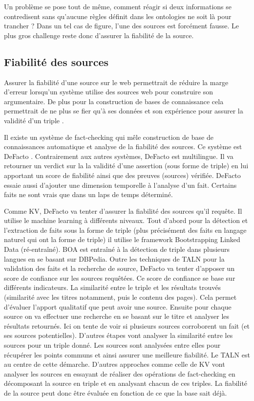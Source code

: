 Un problème se pose tout de même, comment réagir si deux informations se contredisent sans qu'aucune règles définit dans les ontologies ne soit là pour trancher ? Dans un tel cas de figure, l'une des sources est forcément fausse. Le plus gros challenge reste donc d'assurer la fiabilité de la source.

\subsection{Fiabilité des sources}

Assurer la fiabilité d'une source sur le web permettrait de réduire la marge d'erreur lorsqu'un système utilise des sources web pour construire son argumentaire. De plus pour la construction de bases de connaissance cela permettrait de ne plus se fier qu'à ses données et son expérience pour assurer la validité d'un triple \cite{dong2015knowledge}.

Il existe un système de fact-checking qui mêle construction de base de connaissances automatique et analyse de la fiabilité des sources. Ce système est DeFacto \cite{gerber2015}. Contrairement aux autres systèmes, DeFacto est multilingue. Il va retourner un verdict sur la la validité d'une assertion (sous forme de triple) en lui apportant un score de fiabilité ainsi que des preuves (sources) vérifiée. DeFacto essaie aussi d'ajouter une dimension temporelle à l'analyse d'un fait. Certains faits ne sont vrais que dans un laps de temps déterminé.

Comme KV, DeFacto va tenter d'assurer la fiabilité des sources qu'il requête. Il utilise le machine learning à différents niveaux. Tout d'abord pour la détection et l'extraction de faits sous la forme de triple (plus précisément des faits en langage naturel qui ont la forme de triple) il utilise le framework Bootstrapping Linked Data (ré-entraîné). BOA est entraîné à la détection de triple dans plusieurs langues en se basant sur DBPedia. Outre les techniques de TALN pour la validation des faits et la recherche de source, DeFacto va tenter d'apposer un score de confiance sur les sources requêtées. Ce score de confiance se base sur différents indicateurs. La similarité entre le triple et les résultats trouvés (similarité avec les titres notamment, puis le contenu des pages). Cela permet d'évaluer l'apport qualitatif que peut avoir une source. Ensuite pour chaque source on va effectuer une recherche en se basant sur le titre et analyser les résultats retournés. Ici on tente de voir si plusieurs sources corroborent un fait (et ses sources potentielles). D'autres étapes vont analyser la similarité entre les sources pour un triple donné. Les sources sont analysées entre elles pour récupérer les points communs et ainsi assurer une meilleure fiabilité. Le TALN est au centre de cette démarche. D'autres approches comme celle de KV vont analyser les sources en essayant de réaliser des opérations de fact-checking en décomposant la source en triple et en analysant chacun de ces triples. La fiabilité de la source peut donc être évaluée en fonction de ce que la base sait déjà.

